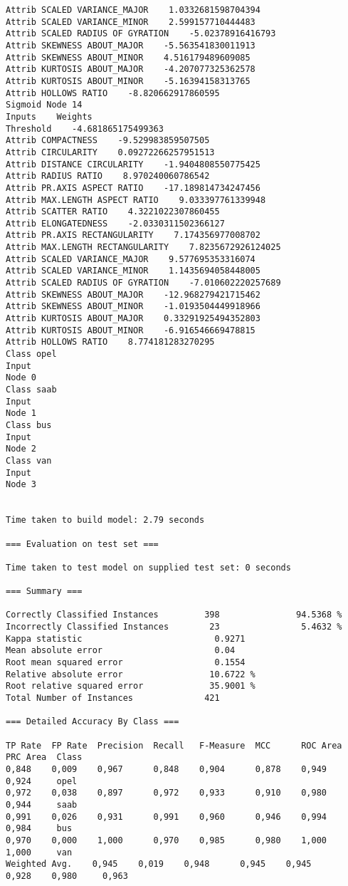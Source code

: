 \documentclass[
	article,			%
	11pt,				%
	oneside,			%
	a4paper,			%
	english,			%
	brazil,				%
	sumario=tradicional
	]{abntex2}
\begin{document}
\begin{lstlisting}
Attrib SCALED VARIANCE_MAJOR    1.0332681598704394
Attrib SCALED VARIANCE_MINOR    2.599157710444483
Attrib SCALED RADIUS OF GYRATION    -5.02378916416793
Attrib SKEWNESS ABOUT_MAJOR    -5.563541830011913
Attrib SKEWNESS ABOUT_MINOR    4.516179489609085
Attrib KURTOSIS ABOUT_MAJOR    -4.207077325362578
Attrib KURTOSIS ABOUT_MINOR    -5.16394158313765
Attrib HOLLOWS RATIO    -8.820662917860595
Sigmoid Node 14
Inputs    Weights
Threshold    -4.681865175499363
Attrib COMPACTNESS    -9.529983859507505
Attrib CIRCULARITY    0.09272266257951513
Attrib DISTANCE CIRCULARITY    -1.9404808550775425
Attrib RADIUS RATIO    8.970240060786542
Attrib PR.AXIS ASPECT RATIO    -17.189814734247456
Attrib MAX.LENGTH ASPECT RATIO    9.033397761339948
Attrib SCATTER RATIO    4.3221022307860455
Attrib ELONGATEDNESS    -2.0330311502366127
Attrib PR.AXIS RECTANGULARITY    7.174356977008702
Attrib MAX.LENGTH RECTANGULARITY    7.8235672926124025
Attrib SCALED VARIANCE_MAJOR    9.577695353316074
Attrib SCALED VARIANCE_MINOR    1.1435694058448005
Attrib SCALED RADIUS OF GYRATION    -7.010602220257689
Attrib SKEWNESS ABOUT_MAJOR    -12.968279421715462
Attrib SKEWNESS ABOUT_MINOR    -1.0193504449918966
Attrib KURTOSIS ABOUT_MAJOR    0.33291925494352803
Attrib KURTOSIS ABOUT_MINOR    -6.916546669478815
Attrib HOLLOWS RATIO    8.774181283270295
Class opel
Input
Node 0
Class saab
Input
Node 1
Class bus
Input
Node 2
Class van
Input
Node 3


Time taken to build model: 2.79 seconds

=== Evaluation on test set ===

Time taken to test model on supplied test set: 0 seconds

=== Summary ===

Correctly Classified Instances         398               94.5368 %
Incorrectly Classified Instances        23                5.4632 %
Kappa statistic                          0.9271
Mean absolute error                      0.04  
Root mean squared error                  0.1554
Relative absolute error                 10.6722 %
Root relative squared error             35.9001 %
Total Number of Instances              421     

=== Detailed Accuracy By Class ===

TP Rate  FP Rate  Precision  Recall   F-Measure  MCC      ROC Area  PRC Area  Class
0,848    0,009    0,967      0,848    0,904      0,878    0,949     0,924     opel
0,972    0,038    0,897      0,972    0,933      0,910    0,980     0,944     saab
0,991    0,026    0,931      0,991    0,960      0,946    0,994     0,984     bus
0,970    0,000    1,000      0,970    0,985      0,980    1,000     1,000     van
Weighted Avg.    0,945    0,019    0,948      0,945    0,945      0,928    0,980     0,963     


\end{lstlisting}
\end{document}
